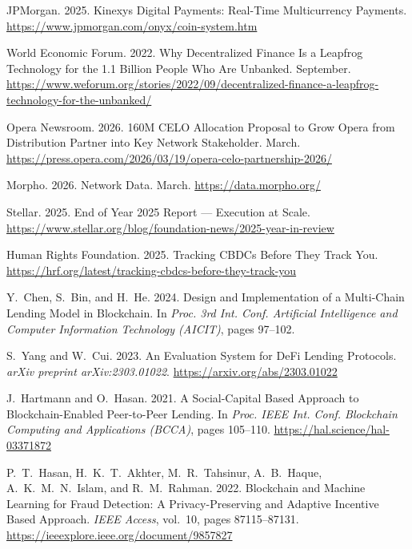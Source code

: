 \documentclass[12pt,a4paper]{report}
\begin{document}
{\begin{enumerate}[label={[\arabic*]}]
\item JPMorgan. 2025. Kinexys Digital Payments: Real-Time Multicurrency Payments. \url{https://www.jpmorgan.com/onyx/coin-system.htm}

\item World Economic Forum. 2022. Why Decentralized Finance Is a Leapfrog Technology for the 1.1 Billion People Who Are Unbanked. September. \url{https://www.weforum.org/stories/2022/09/decentralized-finance-a-leapfrog-technology-for-the-unbanked/}

\item Opera Newsroom. 2026. 160M CELO Allocation Proposal to Grow Opera from Distribution Partner into Key Network Stakeholder. March. \url{https://press.opera.com/2026/03/19/opera-celo-partnership-2026/}

\item Morpho. 2026. Network Data. March. \url{https://data.morpho.org/}

\item Stellar. 2025. End of Year 2025 Report --- Execution at Scale. \url{https://www.stellar.org/blog/foundation-news/2025-year-in-review}

\item Human Rights Foundation. 2025. Tracking CBDCs Before They Track You. \url{https://hrf.org/latest/tracking-cbdcs-before-they-track-you}

\item Y.~Chen, S.~Bin, and H.~He. 2024. Design and Implementation of a Multi-Chain Lending Model in Blockchain. In \emph{Proc. 3rd Int. Conf. Artificial Intelligence and Computer Information Technology (AICIT)}, pages 97--102.

\item S.~Yang and W.~Cui. 2023. An Evaluation System for DeFi Lending Protocols. \emph{arXiv preprint arXiv:2303.01022}. \url{https://arxiv.org/abs/2303.01022}

\item J.~Hartmann and O.~Hasan. 2021. A Social-Capital Based Approach to Blockchain-Enabled Peer-to-Peer Lending. In \emph{Proc. IEEE Int. Conf. Blockchain Computing and Applications (BCCA)}, pages 105--110. \url{https://hal.science/hal-03371872}

\item P.~T.~Hasan, H.~K.~T.~Akhter, M.~R.~Tahsinur, A.~B.~Haque, A.~K.~M.~N.~Islam, and R.~M.~Rahman. 2022. Blockchain and Machine Learning for Fraud Detection: A Privacy-Preserving and Adaptive Incentive Based Approach. \emph{IEEE Access}, vol.~10, pages 87115--87131. \url{https://ieeexplore.ieee.org/document/9857827}


\end{enumerate}}
\end{document}
